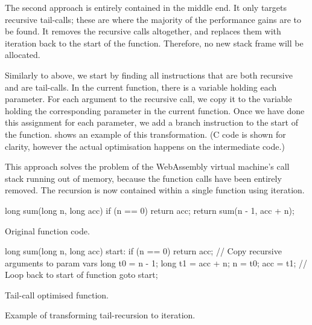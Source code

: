 \documentclass[00-main.tex]{subfiles}
\begin{document}
The second approach is entirely contained in the middle end.
It only targets recursive tail-calls; these are where the majority of the performance gains are to be found.
It removes the recursive calls altogether, and replaces them with iteration back to the start of the function.
Therefore, no new stack frame will be allocated.

Similarly to above, we start by finding all  instructions that are both recursive and are tail-calls.
In the current function, there is a variable holding each parameter.
For each argument to the recursive call, we copy it to the variable holding the corresponding parameter in the current function.
Once we have done this assignment for each parameter, we add a branch instruction to the start of the function.
 shows an example of this transformation.
(C code is shown for clarity, however the actual optimisation happens on the intermediate code.)

This approach solves the problem of the WebAssembly virtual machine's call stack running out of memory, because the function calls have been entirely removed.
The recursion is now contained within a single function using iteration.

\begin{listing}[t]
  \begin{sublisting}[b]{0.49\textwidth}
    \begin{CListing}
      long sum(long n, long acc) {
          if (n == 0) {
              return acc;
          }
          return sum(n - 1, acc + n);
      }
    \end{CListing}
    \caption{Original function code.}
  \end{sublisting}
  \hfill
  \begin{sublisting}[b]{0.49\textwidth}
    \begin{CListing}
      long sum(long n, long acc) {
      start:
          if (n == 0) {
              return acc;
          }
          // Copy recursive arguments to param vars
          long t0 = n - 1;
          long t1 = acc + n;
          n = t0;
          acc = t1;
          // Loop back to start of function
          goto start;
      }
    \end{CListing}
    \caption{Tail-call optimised function.}
  \end{sublisting}
  \caption{Example of transforming tail-recursion to iteration.}
  \label{lst:tail-call optimisation example}
\end{listing}
\end{document}
